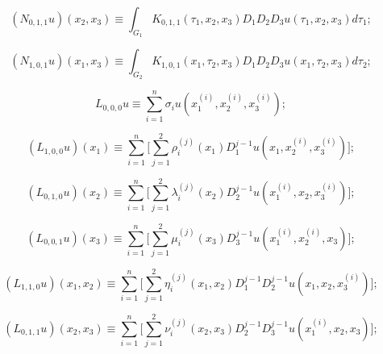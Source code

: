 \[

\left(N_{0, 1, 1} u\right)\left(x_2  ,x_3  \right)\equiv \int_{G_1  }K_{0, 1, 1} \left(\tau _1  ,x_2  ,x_3  \right)D_1   D_2   D_3  u\left(\tau _1  ,x_2  ,x_3  \right)d\tau _1  ;

\]

\[

\left(N_{1, 0, 1} u\right)\left(x_1  ,x_3  \right)\equiv \int _{G_2  }K_{1, 0, 1} \left(x_1  ,\tau _2  ,x_3  \right)D_1   D_2   D_3  u\left(x_1  ,\tau _2  ,x_3  \right)d\tau _2 ;

\]

\[

L_{0, 0, 0} u\equiv \sum\limits _{i=1}^{n}\sigma _{i} u(x_1 ^{(i)} ,x_2 ^{(i)} ,x_3 ^{(i)} );

\]

\[

( L_{1, 0, 0}u) ( x_1) \equiv \sum\limits_{i=1}^{n}

\biggl[ \sum\limits_{j=1}^{2}\rho _{i}^{(j) }( x_1)

D_1 ^{j-1}u( x_1 ,x_2 ^{(i) },x_3 ^{(i)}) \biggr] ;

\]%

\[

( L_{0, 1, 0}u) ( x_2) \equiv \sum\limits_{i=1}^{n}

\biggl[ \sum\limits_{j=1}^{2}\lambda _{i}^{(j) }(x_2 ) D_2 ^{j-1}u( x_1 ^{(i) },x_2 ,x_3 ^{(i) }) \biggr] ;

\]%

\[

( L_{0, 0, 1}u) ( x_3) \equiv \sum\limits_{i=1}^{n}

\biggl[ \sum\limits_{j=1}^{2}\mu _{i}^{(j) }( x_3)

D_3 ^{j-1}u ( x_1 ^{(i) },x_2 ^{(i)

},x_3 ) \biggr] ;

\]%

\[

( L_{1, 1, 0}u) ( x_1 ,x_2 ) \equiv

\sum\limits_{i=1}^{n}\biggl[ \sum\limits_{j=1}^{2}\eta _{i}^{(j)

}( x_1 ,x_2 ) D_1 ^{j-1}{D_2 ^{j-1}u(

x_1 ,x_2 ,x_3 ^{(i) }) }\biggr] ;

\]%

\[

( L_{0, 1, 1}u) ( x_2 ,x_3 ) \equiv

\sum\limits_{i=1}^{n}\biggl[ \sum\limits_{j=1}^{2}\nu _{i}^{(j)

}( x_2 ,x_3 ) D_2 ^{j-1}D_3 ^{j-1}u( x_1 ^{(i) },x_2 ,x_3 ) \biggr] ;

\]%

